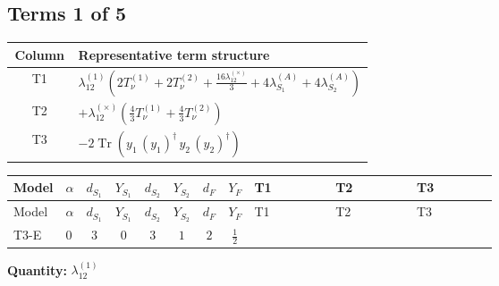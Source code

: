 \documentclass[8pt]{article}
\begin{document}
\begin{landscape}
\subsection*{Terms 1 of 5}
\begin{center}
\begin{tabular}{@{}c >{\raggedright\arraybackslash}p{0.82\linewidth}@{}}
\toprule
Column & Representative term structure \\
\midrule
T1 & \(\displaystyle {\lambda_{12}^{(1)}} \left(2 T_{\nu}^{(1)}+2 T_{\nu}^{(2)}+\frac{16 {\lambda_{12}^{(\times)}}}{3}+4 {\lambda_{S_1}^{(A)}}+4 {\lambda_{S_2}^{(A)}}\right)\) \\
\midrule
T2 & \(\displaystyle +{\lambda_{12}^{(\times)}} \left(\frac{4}{3} T_{\nu}^{(1)}+\frac{4}{3} T_{\nu}^{(2)}\right)\) \\
\midrule
T3 & \(\displaystyle -2 \operatorname{Tr}\!\left({y_1}\,\left({y_1}\right)^{\dagger}\,{y_2}\,\left({y_2}\right)^{\dagger}\right)\) \\
\midrule
\bottomrule
\end{tabular}
\end{center}
\smallskip
\tiny
\begin{longtable}{@{}llcccccc >{\raggedright\arraybackslash}p{0.21\linewidth} >{\raggedright\arraybackslash}p{0.21\linewidth} >{\raggedright\arraybackslash}p{0.21\linewidth}@{}}
\toprule
Model & $\alpha$ & $d_{S_1}$ & $Y_{S_1}$ & $d_{S_2}$ & $Y_{S_2}$ & $d_F$ & $Y_F$ & T1 & T2 & T3 \\
\midrule
\endfirsthead
\toprule
Model & $\alpha$ & $d_{S_1}$ & $Y_{S_1}$ & $d_{S_2}$ & $Y_{S_2}$ & $d_F$ & $Y_F$ & T1 & T2 & T3 \\
\midrule
\endhead
T3-E & $0$ & $3$ & $0$ & $3$ & $1$ & $2$ & $\frac{1}{2}$ & \scriptsize\adjustbox{max width=\linewidth}{$\begin{gathered} {\lambda_{12}^{(1)}} \left(2 T_{\nu}^{(1)}+2 T_{\nu}^{(2)}+\frac{16 {\lambda_{12}^{(\times)}}}{3}+4 {\lambda_{S_1}^{(A)}}+4 {\lambda_{S_2}^{(A)}}\right)\end{gathered}$} & \scriptsize\adjustbox{max width=\linewidth}{$\begin{gathered} +{\lambda_{12}^{(\times)}} \left(\frac{4}{3} T_{\nu}^{(1)}+\frac{4}{3} T_{\nu}^{(2)}\right)\end{gathered}$} & \scriptsize\adjustbox{max width=\linewidth}{$\begin{gathered} -2 \operatorname{Tr}\!\left({y_1}\,\left({y_1}\right)^{\dagger}\,{y_2}\,\left({y_2}\right)^{\dagger}\right)\end{gathered}$} \\
\midrule
\bottomrule
\end{longtable}
\clearpage
\noindent\textbf{Quantity: }$\lambda_{12}^{(1)}$\par\smallskip

\end{landscape}
\end{document}
